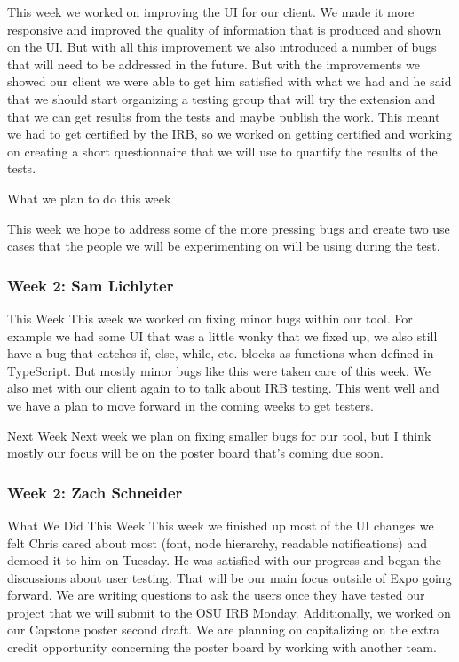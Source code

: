 This week we worked on improving the UI for our client. We made it more responsive and improved the quality of information that is produced and shown on the UI. But with all this improvement we also introduced a number of bugs that will need to be addressed in the future. But with the improvements we showed our client we were able to get him satisfied with what we had and he said that we should start organizing a testing group that will try the extension and that we can get results from the tests and maybe publish the work. This meant we had to get certified by the IRB, so we worked on getting certified and working on creating a short questionnaire that we will use to quantify the results of the tests.

What we plan to do this week

This week we hope to address some of the more pressing bugs and create two use cases that the people we will be experimenting on will be using during the test. 

\subsubsection{Week 2: Sam Lichlyter}

This Week 
This week we worked on fixing minor bugs within our tool. For example we had some UI that was a little wonky that we fixed up, we also still have a bug that catches if, else, while, etc. blocks as functions when defined in TypeScript. But mostly minor bugs like this were taken care of this week. We also met with our client again to to talk about IRB testing. This went well and we have a plan to move forward in the coming weeks to get testers.

Next Week
Next week we plan on fixing smaller bugs for our tool, but I think mostly our focus will be on the poster board that's coming due soon.

\subsubsection{Week 2: Zach Schneider}

What We Did This Week
This week we finished up most of the UI changes we felt Chris cared about most (font, node hierarchy, readable notifications) and demoed it to him on Tuesday. He was satisfied with our progress and began the discussions about user testing. That will be our main focus outside of Expo going forward. We are writing questions to ask the users once they have tested our project that we will submit to the OSU IRB Monday. Additionally, we worked on our Capstone poster second draft. We are planning on capitalizing on the extra credit opportunity concerning the poster board by working with another team.

